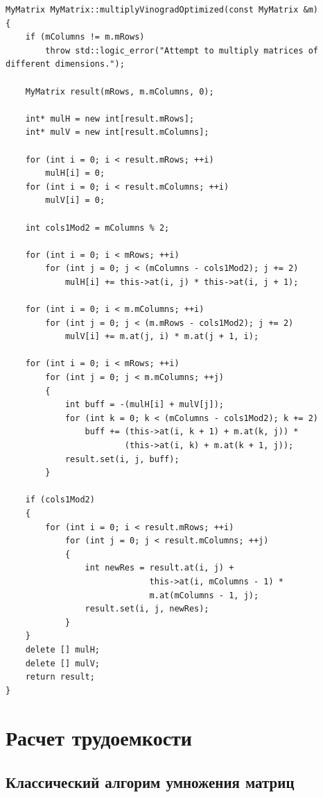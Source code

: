 \documentclass[a4paper,14pt]{report}
\begin{document}
\begin{lstlisting}[label=some-code,caption=Оптимизированный алгорим Винограда]
MyMatrix MyMatrix::multiplyVinogradOptimized(const MyMatrix &m)
{
    if (mColumns != m.mRows)
        throw std::logic_error("Attempt to multiply matrices of different dimensions.");

    MyMatrix result(mRows, m.mColumns, 0);

    int* mulH = new int[result.mRows];
    int* mulV = new int[result.mColumns];

    for (int i = 0; i < result.mRows; ++i)
        mulH[i] = 0;
    for (int i = 0; i < result.mColumns; ++i)
        mulV[i] = 0;

    int cols1Mod2 = mColumns % 2;

    for (int i = 0; i < mRows; ++i)
        for (int j = 0; j < (mColumns - cols1Mod2); j += 2)
            mulH[i] += this->at(i, j) * this->at(i, j + 1);

    for (int i = 0; i < m.mColumns; ++i)
        for (int j = 0; j < (m.mRows - cols1Mod2); j += 2)
            mulV[i] += m.at(j, i) * m.at(j + 1, i);

    for (int i = 0; i < mRows; ++i)
        for (int j = 0; j < m.mColumns; ++j)
        {
            int buff = -(mulH[i] + mulV[j]);
            for (int k = 0; k < (mColumns - cols1Mod2); k += 2)
                buff += (this->at(i, k + 1) + m.at(k, j)) *
                        (this->at(i, k) + m.at(k + 1, j));
            result.set(i, j, buff);
        }

    if (cols1Mod2)
    {
        for (int i = 0; i < result.mRows; ++i)
            for (int j = 0; j < result.mColumns; ++j)
            {
                int newRes = result.at(i, j) +
                             this->at(i, mColumns - 1) *
                             m.at(mColumns - 1, j);
                result.set(i, j, newRes);
            }
    }
    delete [] mulH;
    delete [] mulV;
    return result;
}
\end{lstlisting}


\section*{Расчет трудоемкости}

\subsection*{Классический алгорим умножения матриц}
\end{document}
